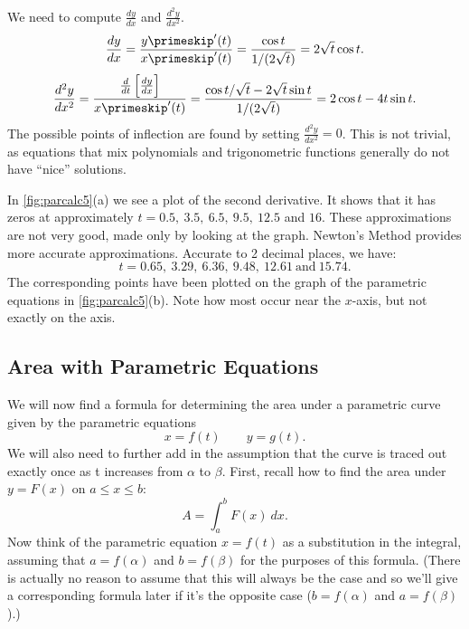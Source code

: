 {We need to compute $\frac{dy}{dx}$ and $\frac{d^2y}{dx^2}$. 
$$\frac{dy}{dx} = \frac{y\primeskip'(t)}{x\primeskip'(t)} = \frac{\cos t}{1/(2\sqrt{t})} = 2\sqrt{t}\cos t.$$
$$\frac{d^2y}{dx^2} = \frac{\frac{d}{dt}\left[\frac{dy}{dx}\right]}{x\primeskip'(t)} = \frac{\cos t/\sqrt{t}-2\sqrt{t}\sin t}{1/(2\sqrt{t})}=2\cos t-4t\sin t.$$
The possible points of inflection are found by setting $\frac{d^2y}{dx^2}=0$. This is not trivial, as equations that mix polynomials and trigonometric functions generally do not have ``nice'' solutions. 

In \autoref{fig:parcalc5}(a) we see a plot of the second derivative. It shows that it has zeros at approximately $t=0.5,\ 3.5,\ 6.5,\ 9.5,\ 12.5$ and $16$. These approximations are not very good, made only by looking at the graph. Newton's Method provides more accurate approximations. Accurate to 2 decimal places, we have:
$$t=0.65,\ 3.29,\ 6.36,\ 9.48,\ 12.61\ \text{and}\ 15.74.$$
The corresponding points have been plotted on the graph of the parametric equations in \autoref{fig:parcalc5}(b). Note how most occur near the $x$-axis, but not exactly on the axis.}


\subsection*{Area with Parametric Equations}

We will now find a formula for determining the area under a parametric curve given by the parametric equations
\[x=f(t)\qquad y=g(t).\]
We will also need to further add in the assumption that the curve is traced out exactly once as t increases from $\alpha$ to $\beta$.
%
First, recall how to find the area under $y=F(x)$ on $a\le x\le b$:
\[A=\int_a^b F(x)\ dx.\]
Now think of the parametric equation $x=f(t)$ as a substitution in the integral, assuming that $a=f(\alpha)$ and $b=f(\beta)$ for the purposes of this formula.  (There is actually no reason to assume that this will always be the case and so we'll give a corresponding formula later if it's the opposite case ($b=f(\alpha)$ and $a=f(\beta)$).)

